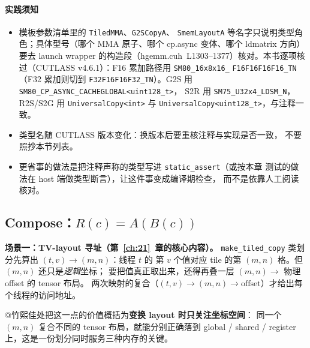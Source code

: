\paragraph{实践须知}
\begin{itemize}
  \item 模板参数清单里的 \texttt{TiledMMA}、\texttt{G2SCopyA}、
        \texttt{SmemLayoutA} 等名字只说明类型角色；具体型号（哪个 MMA
        原子、哪个 cp.async 变体、哪个 ldmatrix 方向）要去 launch wrapper
        的构造段（hgemm.cuh~L1303--1377）核对。本书逐项核过（CUTLASS
        v4.6.1）：F16 累加路径用 \texttt{SM80\_\allowbreak{}16x8x16\_\allowbreak{}}\allowbreak
        \texttt{F16\allowbreak{}F16\allowbreak{}F16\allowbreak{}F16\_\allowbreak{}TN}（F32 累加则切到
        \texttt{F32\allowbreak{}F16\allowbreak{}F16\allowbreak{}F32\_\allowbreak{}TN}）。G2S 用
        \texttt{SM80\_\allowbreak{}CP\_\allowbreak{}ASYNC\_\allowbreak{}}\allowbreak\texttt{CACHEGLOBAL\allowbreak{}<uint128\_\allowbreak{}t>}，
        S2R 用 \texttt{SM75\_\allowbreak{}U32x4\_\allowbreak{}LDSM\_\allowbreak{}N}，R2S/S2G 用
        \texttt{Universal\allowbreak{}Copy\allowbreak{}<int>} 与
        \texttt{Universal\allowbreak{}Copy\allowbreak{}<}\allowbreak\texttt{uint128\_t>}，与注释一致。
  \item 类型名随 CUTLASS 版本变化：换版本后要重核注释与实现是否一致，
        不要照抄本节列表。
  \item 更省事的做法是把注释声称的类型写进 \texttt{static\_\allowbreak{}assert}（或按本章
        测试的做法在 host 端做类型断言），让这件事变成编译期检查，
        而不是依靠人工阅读核对。
\end{itemize}

\subsection{Compose：$R(c)=A(B(c))$}

\textbf{场景一：TV-layout 寻址（第~\ref{ch:21}~章的核心内容）。}
\texttt{make\_\allowbreak{}tiled\_\allowbreak{}copy} 类划分先算出 $(t,v)\to(m,n)$：线程 $t$ 的
第 $v$ 个值对应 tile 的第 $(m,n)$ 格。但 $(m,n)$ 还只是\emph{逻辑}坐标；
要把值真正取出来，还得再叠一层 $(m,n)\to$ 物理 offset 的 tensor 布局。
两次映射的复合（$(t,v)\to(m,n)\to\mathrm{offset}$）才给出每个线程的访问地址。

@竹熙佳处把这一点的价值概括为\textbf{变换 layout 时只关注坐标空间}：
同一个 $(m,n)$ 复合不同的 tensor 布局，就能分别正确落到 global / shared /
register 上，这是一份划分同时服务三种内存的关键。


